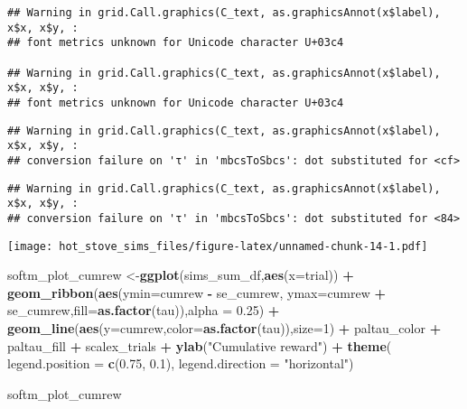 \documentclass[
]{article}
\newenvironment{Shaded}{\begin{snugshade}}{\end{snugshade}}
\newcommand{\AttributeTok}[1]{\textcolor[rgb]{0.13,0.29,0.53}{#1}}
\newcommand{\DecValTok}[1]{\textcolor[rgb]{0.00,0.00,0.81}{#1}}
\newcommand{\FloatTok}[1]{\textcolor[rgb]{0.00,0.00,0.81}{#1}}
\newcommand{\FunctionTok}[1]{\textcolor[rgb]{0.13,0.29,0.53}{\textbf{#1}}}
\newcommand{\NormalTok}[1]{#1}
\newcommand{\OtherTok}[1]{\textcolor[rgb]{0.56,0.35,0.01}{#1}}
\newcommand{\SpecialCharTok}[1]{\textcolor[rgb]{0.81,0.36,0.00}{\textbf{#1}}}
\newcommand{\StringTok}[1]{\textcolor[rgb]{0.31,0.60,0.02}{#1}}
\begin{document}
\begin{verbatim}
## Warning in grid.Call.graphics(C_text, as.graphicsAnnot(x$label), x$x, x$y, :
## font metrics unknown for Unicode character U+03c4

## Warning in grid.Call.graphics(C_text, as.graphicsAnnot(x$label), x$x, x$y, :
## font metrics unknown for Unicode character U+03c4
\end{verbatim}

\begin{verbatim}
## Warning in grid.Call.graphics(C_text, as.graphicsAnnot(x$label), x$x, x$y, :
## conversion failure on 'τ' in 'mbcsToSbcs': dot substituted for <cf>
\end{verbatim}

\begin{verbatim}
## Warning in grid.Call.graphics(C_text, as.graphicsAnnot(x$label), x$x, x$y, :
## conversion failure on 'τ' in 'mbcsToSbcs': dot substituted for <84>
\end{verbatim}

\texttt{[image: hot\_stove\_sims\_files/figure-latex/unnamed-chunk-14-1.pdf]}

\begin{Shaded}
\begin{Highlighting}[]
\NormalTok{softm\_plot\_cumrew }\OtherTok{\textless{}{-}}\FunctionTok{ggplot}\NormalTok{(sims\_sum\_df,}\FunctionTok{aes}\NormalTok{(}\AttributeTok{x=}\NormalTok{trial)) }\SpecialCharTok{+} 
  \FunctionTok{geom\_ribbon}\NormalTok{(}\FunctionTok{aes}\NormalTok{(}\AttributeTok{ymin=}\NormalTok{cumrew }\SpecialCharTok{{-}}\NormalTok{ se\_cumrew, }\AttributeTok{ymax=}\NormalTok{cumrew }\SpecialCharTok{+}\NormalTok{ se\_cumrew,}\AttributeTok{fill=}\FunctionTok{as.factor}\NormalTok{(tau)),}\AttributeTok{alpha =} \FloatTok{0.25}\NormalTok{) }\SpecialCharTok{+}
  \FunctionTok{geom\_line}\NormalTok{(}\FunctionTok{aes}\NormalTok{(}\AttributeTok{y=}\NormalTok{cumrew,}\AttributeTok{color=}\FunctionTok{as.factor}\NormalTok{(tau)),}\AttributeTok{size=}\DecValTok{1}\NormalTok{) }\SpecialCharTok{+} 
\NormalTok{  paltau\_color }\SpecialCharTok{+} 
\NormalTok{  paltau\_fill }\SpecialCharTok{+} 
\NormalTok{  scalex\_trials }\SpecialCharTok{+}
  \FunctionTok{ylab}\NormalTok{(}\StringTok{"Cumulative reward"}\NormalTok{) }\SpecialCharTok{+}
  \FunctionTok{theme}\NormalTok{(}
    \AttributeTok{legend.position =} \FunctionTok{c}\NormalTok{(}\FloatTok{0.75}\NormalTok{, }\FloatTok{0.1}\NormalTok{),}
    \AttributeTok{legend.direction =} \StringTok{"horizontal"}\NormalTok{)}

\NormalTok{softm\_plot\_cumrew}
\end{Highlighting}
\end{Shaded}
\end{document}

